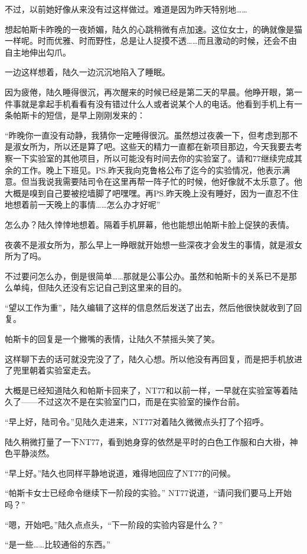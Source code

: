 不过，以前她好像从来没有过这样做过。难道是因为昨天特别地……

想起帕斯卡昨晚的一夜娇媚，陆久的心跳稍微有点加速。这位女士，的确就像是猫一样呢。时而优雅、时而野性，总是让人捉摸不透……而且激动的时候，还会不由自主地伸出勾爪。

一边这样想着，陆久一边沉沉地陷入了睡眠。

因为疲倦，陆久睡得很沉，再次醒来的时候已经是第二天的早晨。他睁开眼，第一件事就是拿起手机看看有没有错过什么人或者说某个人的电话。他看到手机上有一条帕斯卡的短信，是早上刚刚发来的：

“昨晚你一直没有动静，我猜你一定睡得很沉。虽然想过夜袭一下，但考虑到那不是淑女所为，所以还是算了吧。这些天的精力一直都在新项目那边，今天我要去考察一下实验室的其他项目，所以可能没有时间去你的实验室了。请和77继续完成其余的工作。晚上下班见。PS.昨天我向克鲁格公布了迄今的实验情况，他表示满意。但当我说我需要陆司令在这里再帮一阵子忙的时候，他好像就不太乐意了。他大概是嗅到自己要被挖墙脚了吧嘿嘿。再PS.昨天晚上没有睡好，因为一直忍不住地想着前一天晚上的事情……怎么办才好呢”

怎么办？陆久悻悻地想着。隔着手机屏幕，他也能想出帕斯卡脸上促狭的表情。

夜袭不是淑女所为，那么早上一睁眼就开始想一些深夜才会发生的事情，就是淑女所为了吗。

不过要问怎么办，倒是很简单……那就是公事公办。虽然和帕斯卡的关系已不是那么单纯，但陆久还没有忘记自己到这里来的目的。

“望以工作为重”，陆久编辑了这样的信息然后发送了出去，然后他很快就收到了回复。

帕斯卡的回复是一个撇嘴的表情，让陆久不禁摇头笑了笑。

这样聊下去的话可就没完没了了，陆久心想。所以他没有再回复，而是把手机放进了兜里朝着实验室走去。

大概是已经知道陆久和帕斯卡回来了，NT77和以前一样，一早就在实验室等着陆久了——不过这次不是在实验室门口，而是在实验室的操作台前。

“早上好，陆司令。”见陆久走进来，NT77对着陆久微微点头打了个招呼。

陆久稍微打量了一下NT77，看到她身穿的依然是平时的白色工作服和白大褂，神色平静淡然。

“早上好。”陆久也同样平静地说道，难得地回应了NT77的问候。

“帕斯卡女士已经命令继续下一阶段的实验。” NT77说道，“请问我们要马上开始吗？”

“嗯，开始吧。”陆久点点头，“下一阶段的实验内容是什么？”

“是一些……比较通俗的东西。”

